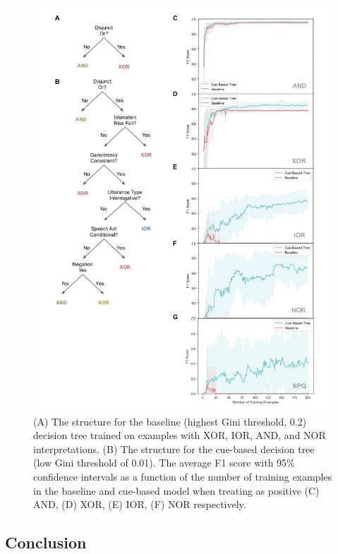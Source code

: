 \documentclass[
  ,man,floatsintext]{apa6}
\begin{document}
\begin{figure}
\centering
\includegraphics{figs/wholeFigure-1.pdf}
\caption{\label{fig:wholeFigure}(A) The structure for the baseline (highest Gini threshold, 0.2) decision tree trained on examples with XOR, IOR, AND, and NOR interpretations. (B) The structure for the cue-based decision tree (low Gini threshold of 0.01). The average F1 score with 95\% confidence intervals as a function of the number of training examples in the baseline and cue-based model when treating as positive (C) AND, (D) XOR, (E) IOR, (F) NOR respectively.}
\end{figure}

\hypertarget{conclusion-1}{%
\subsection{Conclusion}\label{conclusion-1}}
\end{document}
